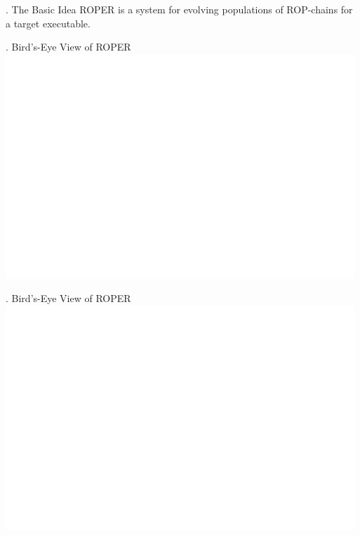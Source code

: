 \documentclass[9pt]{beamer}
\begin{document}
\begin{frame}{\theframenumber. The Basic Idea}
  ROPER is a system for evolving populations of ROP-chains for a target executable. 
\end{frame}


\begin{frame}{\theframenumber. Bird's-Eye View of ROPER}
      \includegraphics[width=\textwidth]{../images/architecture-transparent.png}
\end{frame}

\begin{frame}{\theframenumber. Bird's-Eye View of ROPER}
      \includegraphics[width=\textwidth]{../images/architecture-transparent-gadget-extraction.png}
\end{frame}
\end{document}
